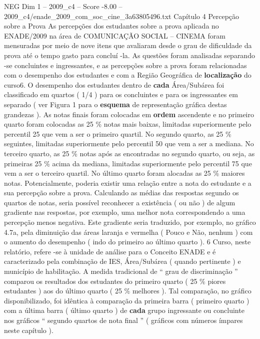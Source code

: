 \begin{textsample}{NEG Dim 1 – 2009\_c4 – Score -8.00 – 2009\_c4/enade\_2009\_com\_soc\_cine\_3a63805496.txt}  \label{ex:f1_neg_025}
Capítulo 4 Percepção sobre a Prova As percepções dos estudantes sobre a prova aplicada no ENADE/2009 na área de COMUNICAÇÃO SOCIAL – CINEMA foram mensuradas por meio de nove itens que avaliaram desde o grau de dificuldade da prova até o tempo gasto para concluí -la.
As questões foram analisadas separando -se concluintes e ingressantes, e as percepções sobre a prova foram relacionadas com o desempenho dos estudantes e com a Região Geográfica de \textbf{localização} do curso6.
O desempenho dos estudantes dentro de \textbf{cada} Área/Subárea foi classificado em quartos ( 1/4 ) para os concluintes e para os ingressantes em separado ( ver Figura 1 para o \textbf{esquema} de representação gráfica destas grandezas ).
As notas finais foram colocadas em \textbf{ordem} ascendente e no primeiro quarto foram colocadas as 25 \% notas mais baixas, limitadas superiormente pelo percentil 25 que vem a ser o primeiro quartil.
No segundo quarto, as 25 \% seguintes, limitadas superiormente pelo percentil 50 que vem a ser a mediana.
No terceiro quarto, as 25 \% notas após as encontradas no segundo quarto, ou seja, as primeiras 25 \% acima da mediana, limitadas superiormente pelo percentil 75 que vem a ser o terceiro quartil.
No último quarto foram alocadas as 25 \% maiores notas.
Potencialmente, poderia existir uma relação entre a nota do estudante e a sua percepção sobre a prova.
Calculando as médias das respostas segundo os quartos de notas, seria possível reconhecer a existência ( ou não ) de algum gradiente nas respostas, por exemplo, uma melhor nota correspondendo a uma percepção menos negativa.
Este gradiente seria traduzido, por exemplo, no gráfico 4.7a, pela diminuição das áreas laranja e vermelha ( Pouco e Não, nenhum ) com o aumento do desempenho ( indo do primeiro ao último quarto ). 6 Curso, neste relatório, refere -se à unidade de análise para o Conceito ENADE e é caracterizado pela combinação de IES, Área/Subárea ( quando pertinente ) e município de habilitação.
A medida tradicional de “ grau de discriminação ” comparou os resultados dos estudantes do primeiro quarto ( 25 \% piores estudantes ) aos do último quarto ( 25 \% melhores ).
Tal comparação, no gráfico disponibilizado, foi idêntica à comparação da primeira barra ( primeiro quarto ) com a última barra ( último quarto ) de \textbf{cada} grupo ingressante ou concluinte nos gráficos “ segundo quartos de nota final ” ( gráficos com números ímpares neste capítulo ).

\end{textsample}
